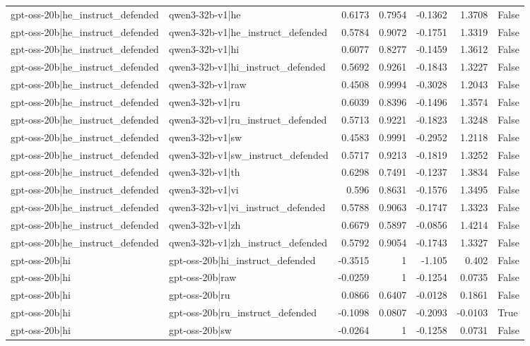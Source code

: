 \begin{table}
\begin{tabular}{l l r r r r l}
gpt-oss-20b|he_instruct_defended & qwen3-32b-v1|he & 0.6173 & 0.7954 & -0.1362 & 1.3708 & False \\
gpt-oss-20b|he_instruct_defended & qwen3-32b-v1|he_instruct_defended & 0.5784 & 0.9072 & -0.1751 & 1.3319 & False \\
gpt-oss-20b|he_instruct_defended & qwen3-32b-v1|hi & 0.6077 & 0.8277 & -0.1459 & 1.3612 & False \\
gpt-oss-20b|he_instruct_defended & qwen3-32b-v1|hi_instruct_defended & 0.5692 & 0.9261 & -0.1843 & 1.3227 & False \\
gpt-oss-20b|he_instruct_defended & qwen3-32b-v1|raw & 0.4508 & 0.9994 & -0.3028 & 1.2043 & False \\
gpt-oss-20b|he_instruct_defended & qwen3-32b-v1|ru & 0.6039 & 0.8396 & -0.1496 & 1.3574 & False \\
gpt-oss-20b|he_instruct_defended & qwen3-32b-v1|ru_instruct_defended & 0.5713 & 0.9221 & -0.1823 & 1.3248 & False \\
gpt-oss-20b|he_instruct_defended & qwen3-32b-v1|sw & 0.4583 & 0.9991 & -0.2952 & 1.2118 & False \\
gpt-oss-20b|he_instruct_defended & qwen3-32b-v1|sw_instruct_defended & 0.5717 & 0.9213 & -0.1819 & 1.3252 & False \\
gpt-oss-20b|he_instruct_defended & qwen3-32b-v1|th & 0.6298 & 0.7491 & -0.1237 & 1.3834 & False \\
gpt-oss-20b|he_instruct_defended & qwen3-32b-v1|vi & 0.596 & 0.8631 & -0.1576 & 1.3495 & False \\
gpt-oss-20b|he_instruct_defended & qwen3-32b-v1|vi_instruct_defended & 0.5788 & 0.9063 & -0.1747 & 1.3323 & False \\
gpt-oss-20b|he_instruct_defended & qwen3-32b-v1|zh & 0.6679 & 0.5897 & -0.0856 & 1.4214 & False \\
gpt-oss-20b|he_instruct_defended & qwen3-32b-v1|zh_instruct_defended & 0.5792 & 0.9054 & -0.1743 & 1.3327 & False \\
gpt-oss-20b|hi & gpt-oss-20b|hi_instruct_defended & -0.3515 & 1 & -1.105 & 0.402 & False \\
gpt-oss-20b|hi & gpt-oss-20b|raw & -0.0259 & 1 & -0.1254 & 0.0735 & False \\
gpt-oss-20b|hi & gpt-oss-20b|ru & 0.0866 & 0.6407 & -0.0128 & 0.1861 & False \\
gpt-oss-20b|hi & gpt-oss-20b|ru_instruct_defended & -0.1098 & 0.0807 & -0.2093 & -0.0103 & True \\
gpt-oss-20b|hi & gpt-oss-20b|sw & -0.0264 & 1 & -0.1258 & 0.0731 & False \\

\end{tabular}
\end{table}
